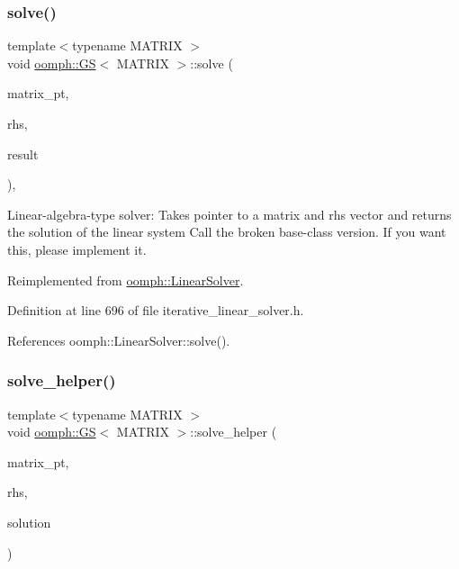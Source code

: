 \subsubsection{\texorpdfstring{solve()}{solve()}\hspace{0.1cm}{\footnotesize\ttfamily [3/3]}}
{\footnotesize\ttfamily template$<$typename M\+A\+T\+R\+IX $>$ \\
void \hyperlink{classoomph_1_1GS}{oomph\+::\+GS}$<$ M\+A\+T\+R\+IX $>$\+::solve (\begin{DoxyParamCaption}\item[{\hyperlink{classoomph_1_1DoubleMatrixBase}{Double\+Matrix\+Base} $\ast$const \&}]{matrix\+\_\+pt,  }\item[{const \hyperlink{classoomph_1_1Vector}{Vector}$<$ double $>$ \&}]{rhs,  }\item[{\hyperlink{classoomph_1_1Vector}{Vector}$<$ double $>$ \&}]{result }\end{DoxyParamCaption})\hspace{0.3cm}{\ttfamily [inline]}, {\ttfamily [virtual]}}



Linear-\/algebra-\/type solver\+: Takes pointer to a matrix and rhs vector and returns the solution of the linear system Call the broken base-\/class version. If you want this, please implement it. 



Reimplemented from \hyperlink{classoomph_1_1LinearSolver_a1f7a2ee2cd18d3dafc20a61ca2f52dbb}{oomph\+::\+Linear\+Solver}.



Definition at line 696 of file iterative\+\_\+linear\+\_\+solver.\+h.



References oomph\+::\+Linear\+Solver\+::solve().

\mbox{\label{classoomph_1_1GS_a727ae9502ba5cd458358b5c50a57437e}} 
\subsubsection{\texorpdfstring{solve\+\_\+helper()}{solve\_helper()}}
{\footnotesize\ttfamily template$<$typename M\+A\+T\+R\+IX $>$ \\
void \hyperlink{classoomph_1_1GS}{oomph\+::\+GS}$<$ M\+A\+T\+R\+IX $>$\+::solve\+\_\+helper (\begin{DoxyParamCaption}\item[{\hyperlink{classoomph_1_1DoubleMatrixBase}{Double\+Matrix\+Base} $\ast$const \&}]{matrix\+\_\+pt,  }\item[{const \hyperlink{classoomph_1_1DoubleVector}{Double\+Vector} \&}]{rhs,  }\item[{\hyperlink{classoomph_1_1DoubleVector}{Double\+Vector} \&}]{solution }\end{DoxyParamCaption})\hspace{0.3cm}{\ttfamily [private]}}



